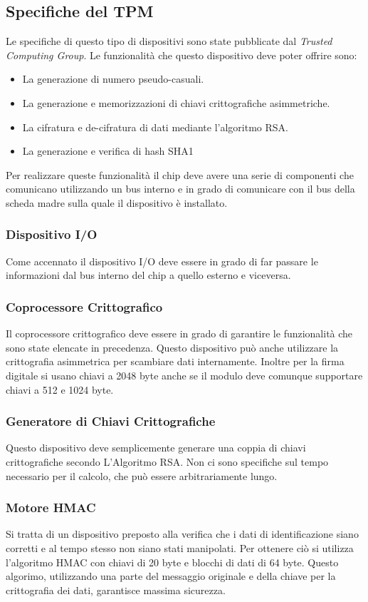 \subsection{Specifiche del TPM}
Le specifiche di questo tipo di dispositivi sono state pubblicate dal \textit{Trusted Computing Group}. Le funzionalità che questo dispositivo deve poter offrire sono:
\begin{itemize}
    \item La generazione di numero pseudo-casuali.
    \item La generazione e memorizzazioni di chiavi crittografiche asimmetriche.
    \item La cifratura e de-cifratura di dati mediante l'algoritmo RSA.
    \item La generazione e verifica di hash SHA1
\end{itemize}
Per realizzare queste funzionalità il chip deve avere una serie di componenti che comunicano utilizzando un bus interno e in grado di comunicare con il bus della scheda madre sulla quale il dispositivo è installato.

\subsubsection{Dispositivo I/O}
Come accennato il dispositivo I/O deve essere in grado di far passare le informazioni dal bus interno del chip a quello esterno e viceversa.

\subsubsection{Coprocessore Crittografico}
Il coprocessore crittografico deve essere in grado di garantire le funzionalità che sono state elencate in precedenza. Questo dispositivo può anche utilizzare la crittografia asimmetrica per scambiare dati internamente. Inoltre per la firma digitale si usano chiavi a 2048 byte anche se il modulo deve comunque supportare chiavi a 512 e 1024 byte.

\subsubsection{Generatore di Chiavi Crittografiche}
Questo dispositivo deve semplicemente generare una coppia di chiavi crittografiche secondo L'Algoritmo RSA. Non ci sono specifiche sul tempo necessario per il calcolo, che può essere arbitrariamente lungo.

\subsubsection{Motore HMAC}
Si tratta di un dispositivo preposto alla verifica che i dati di identificazione siano corretti e al tempo stesso non siano stati manipolati. Per ottenere ciò si utilizza l'algoritmo HMAC con chiavi di 20 byte e blocchi di dati di 64 byte. Questo algorimo, utilizzando una parte del messaggio originale e della chiave per la crittografia dei dati, garantisce massima sicurezza.

